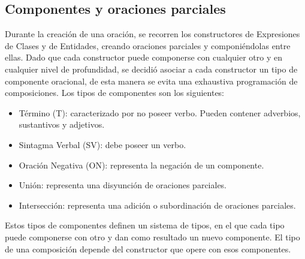 \subsection{Componentes y oraciones parciales}
Durante la creación de una oración, se recorren los constructores de Expresiones de Clases y de Entidades, creando oraciones parciales y componiéndolas entre ellas. Dado que cada constructor puede componerse con cualquier otro y en cualquier nivel de profundidad, se decidió asociar a cada constructor un tipo de componente oracional, de esta manera se evita una exhaustiva programación de composiciones.
Los tipos de componentes son los siguientes:
\begin{itemize}
    \item Término (T): caracterizado por no poseer verbo. Pueden contener adverbios, sustantivos y adjetivos.
    \item Sintagma Verbal (SV): debe poseer un verbo.
    \item Oración Negativa (ON): representa la negación de un componente.
    \item Unión: representa una disyunción de oraciones parciales.
    \item Intersección: representa una adición o subordinación de oraciones parciales.
\end{itemize}

Estos tipos de componentes definen un sistema de tipos, en el que cada tipo puede componerse con otro y dan como resultado un nuevo componente. El tipo de una composición depende del constructor que opere con esos componentes.

